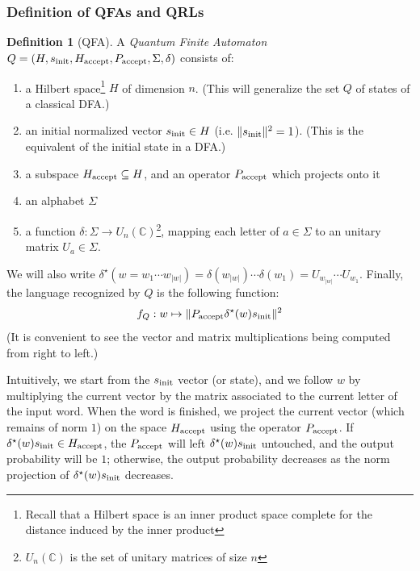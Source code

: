 \documentclass[12pt,a4paper]{article}
\theoremstyle{plain}
\theoremstyle{definition}
\newtheorem*{definition}{Definition}
\begin{document}
\subsubsection{Definition of QFAs and QRLs}
\begin{definition}[QFA]
    A \emph{Quantum Finite Automaton} $Q=(H, s_{\textnormal{init}}, H_{\textnormal{accept}}, P_{\textnormal{accept}}, \Sigma, \delta)$ consists of:
    \begin{enumerate}[label=--, noitemsep]
        \item a Hilbert space\footnote{Recall that a Hilbert space is an inner product space complete for the distance induced by the inner product} $H$ of dimension $n$. (This will generalize the set $Q$ of states of a classical DFA.)
        \item an initial normalized vector $s_{\textnormal{init}}\in H$ (i.e. $\|s_{\textnormal{init}}\|^2=1$). (This is the equivalent of the initial state in a DFA.)
        \item a subspace $H_{\textnormal{accept}} \subseteq H$, and an operator $P_{\textnormal{accept}}$ which projects onto it
        \item an alphabet $\Sigma$
        \item a function $\delta : \Sigma \to U_n(\mathbb{C})$\footnote{$U_n(\mathbb{C})$ is the set of unitary matrices of size $n$}, mapping each letter of $a\in\Sigma$ to an unitary matrix $U_a\in\Sigma$.
    \end{enumerate}
    
    We will also write $\delta^\star(w=w_1\cdots w_{|w|}) = \delta(w_{|w|})\cdots \delta(w_1) = U_{w_{|w|}}\cdots U_{w_1}$. Finally, the language recognized by $Q$ is the following function:
    \begin{equation*}
        f_Q : w \mapsto \|P_{\textnormal{accept}}\delta^\star(w)s_{\textnormal{init}}\|^2
    \end{equation*}
    (It is convenient to see the vector and matrix multiplications being computed from right to left.)
\end{definition}

Intuitively, we start from the $s_{\textnormal{init}}$ vector (or state), and we follow $w$ by multiplying the current vector by the matrix associated to the current letter of the input word. When the word is finished, we project the current vector (which remains of norm $1$) on the space $H_{\textnormal{accept}}$ using the operator $P_{\textnormal{accept}}$. If $\delta^\star(w)s_{\textnormal{init}}\in H_{\textnormal{accept}}$, the $P_{\textnormal{accept}}$ will left $\delta^\star(w)s_{\textnormal{init}}$ untouched, and the output probability will be $1$; otherwise, the output probability decreases as the norm projection of $\delta^\star(w)s_{\textnormal{init}}$ decreases.
\end{document}
